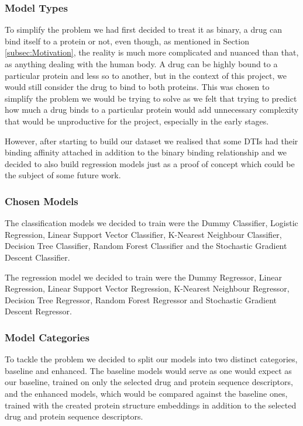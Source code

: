 \subsubsection{Model Types}

To simplify the problem we had first decided to treat it as binary, a drug can bind itself to a protein or not, even though, as mentioned in Section \ref{subsec:Motivation}, the reality is much more complicated and nuanced than that, as anything dealing with the human body. A drug can be highly bound to a particular protein and less so to another, but in the context of this project, we would still consider the drug to bind to both proteins. This was chosen to simplify the problem we would be trying to solve as we felt that trying to predict how much a drug binds to a particular protein would add unnecessary complexity that would be unproductive for the project, especially in the early stages. 

However, after starting to build our dataset we realised that some DTIs had their binding affinity attached in addition to the binary binding relationship and we decided to also build regression models just as a proof of concept which could be the subject of some future work.

\subsubsection{Chosen Models}

The classification models we decided to train were the Dummy Classifier, Logistic Regression, Linear Support Vector Classifier,  K-Nearest Neighbour Classifier, Decision Tree Classifier,  Random Forest Classifier and the Stochastic Gradient Descent Classifier.


The regression model we decided to train were the  Dummy Regressor, Linear Regression, Linear Support Vector Regression, K-Nearest Neighbour Regressor,  Decision Tree Regressor, Random Forest Regressor and Stochastic Gradient Descent Regressor.

\subsubsection{Model Categories}

To tackle the problem we decided to split our models into two distinct categories, baseline and enhanced. The baseline models would serve as one would expect as our baseline, trained on only the selected drug and protein sequence descriptors, and the enhanced models, which would be compared against the baseline ones, trained with the created protein structure embeddings in addition to the selected drug and protein sequence descriptors. 

